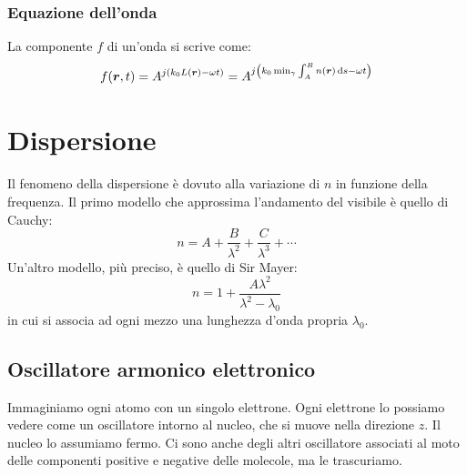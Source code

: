 \subsubsection{Equazione dell'onda}
La componente $f$ di un'onda si scrive come:
\begin{equation}
  f(\boldsymbol{r},t)=A^{j\left(k_0L(\boldsymbol{r})-\omega t\right)}=A^{j\left(k_0\min_\gamma\int_A^B n(\boldsymbol{r})\,\mathrm{d} s-\omega t\right)}
\end{equation}


\section{Dispersione}
Il fenomeno della dispersione è dovuto alla variazione di $n$ in funzione della frequenza. Il primo modello che approssima l'andamento del visibile è quello di Cauchy:
\begin{equation}
  n=A+\frac{B}{\lambda^2}+\frac{C}{\lambda^3}+\cdots
\end{equation}
Un'altro modello, più preciso, è quello di Sir Mayer:
\begin{equation}
  n=1+\frac{A\lambda^2}{\lambda^2-\lambda_0}
  \label{Mayerdisp}
\end{equation}
in cui si associa ad ogni mezzo una lunghezza d'onda propria $\lambda_0$.
\subsection{Oscillatore armonico elettronico}
Immaginiamo ogni atomo con un singolo elettrone. Ogni elettrone lo possiamo vedere come un oscillatore intorno al nucleo, che si muove nella direzione $z$. Il nucleo lo assumiamo fermo. Ci sono anche degli altri oscillatore associati al moto delle componenti positive e negative delle molecole, ma le trascuriamo.


